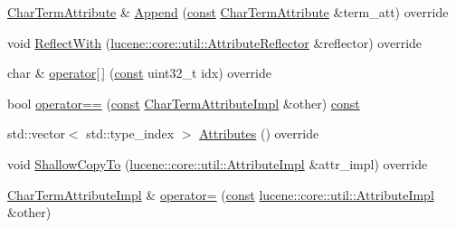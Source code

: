 \begin{DoxyCompactItemize}
\item 
\mbox{\hyperlink{classlucene_1_1core_1_1analysis_1_1tokenattributes_1_1CharTermAttribute}{Char\+Term\+Attribute}} \& \mbox{\hyperlink{classlucene_1_1core_1_1analysis_1_1tokenattributes_1_1CharTermAttributeImpl_ab8c8f791a3a504d86b3578a6f43810d1}{Append}} (\mbox{\hyperlink{ZlibCrc32_8h_a2c212835823e3c54a8ab6d95c652660e}{const}} \mbox{\hyperlink{classlucene_1_1core_1_1analysis_1_1tokenattributes_1_1CharTermAttribute}{Char\+Term\+Attribute}} \&term\+\_\+att) override
\item 
void \mbox{\hyperlink{classlucene_1_1core_1_1analysis_1_1tokenattributes_1_1CharTermAttributeImpl_ae434068c40b8eab62af50e0e33a71bf4}{Reflect\+With}} (\mbox{\hyperlink{namespacelucene_1_1core_1_1util_a7dbb701adaed055f73fb95eec83da10a}{lucene\+::core\+::util\+::\+Attribute\+Reflector}} \&reflector) override
\item 
char \& \mbox{\hyperlink{classlucene_1_1core_1_1analysis_1_1tokenattributes_1_1CharTermAttributeImpl_a65259a0e94791f009d7109f7bbd7d74e}{operator\mbox{[}$\,$\mbox{]}}} (\mbox{\hyperlink{ZlibCrc32_8h_a2c212835823e3c54a8ab6d95c652660e}{const}} uint32\+\_\+t idx) override
\item 
bool \mbox{\hyperlink{classlucene_1_1core_1_1analysis_1_1tokenattributes_1_1CharTermAttributeImpl_a2d741886d3be18e04bcbc1fbccad62a1}{operator==}} (\mbox{\hyperlink{ZlibCrc32_8h_a2c212835823e3c54a8ab6d95c652660e}{const}} \mbox{\hyperlink{classlucene_1_1core_1_1analysis_1_1tokenattributes_1_1CharTermAttributeImpl}{Char\+Term\+Attribute\+Impl}} \&other) \mbox{\hyperlink{ZlibCrc32_8h_a2c212835823e3c54a8ab6d95c652660e}{const}}
\item 
std\+::vector$<$ std\+::type\+\_\+index $>$ \mbox{\hyperlink{classlucene_1_1core_1_1analysis_1_1tokenattributes_1_1CharTermAttributeImpl_a7d8986b373cd9c2dfb2de25dd12000fd}{Attributes}} () override
\item 
void \mbox{\hyperlink{classlucene_1_1core_1_1analysis_1_1tokenattributes_1_1CharTermAttributeImpl_ae37cc1fbce5614f5e60800d3f9f96d33}{Shallow\+Copy\+To}} (\mbox{\hyperlink{classlucene_1_1core_1_1util_1_1AttributeImpl}{lucene\+::core\+::util\+::\+Attribute\+Impl}} \&attr\+\_\+impl) override
\item 
\mbox{\hyperlink{classlucene_1_1core_1_1analysis_1_1tokenattributes_1_1CharTermAttributeImpl}{Char\+Term\+Attribute\+Impl}} \& \mbox{\hyperlink{classlucene_1_1core_1_1analysis_1_1tokenattributes_1_1CharTermAttributeImpl_ac49b714c3f8e438ddaa27dc1a2421144}{operator=}} (\mbox{\hyperlink{ZlibCrc32_8h_a2c212835823e3c54a8ab6d95c652660e}{const}} \mbox{\hyperlink{classlucene_1_1core_1_1util_1_1AttributeImpl}{lucene\+::core\+::util\+::\+Attribute\+Impl}} \&other)

\end{DoxyCompactItemize}
